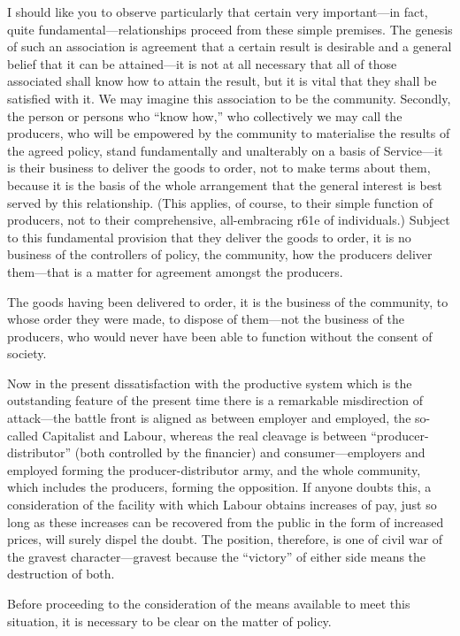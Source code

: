 \documentclass{book}
\begin{document}
I should like you to observe particularly that certain very important—in fact, quite fundamental—relationships proceed from these simple premises. The genesis of such an association is agreement that a certain result is desirable and a general belief that it can be attained—it is not at all necessary that all of those associated shall know how to attain the result, but it is vital that they shall be satisfied with it. We may imagine this association to be the community. Secondly, the person or persons who “know how,” who collectively we may call the producers, who will be empowered by the community to materialise the results of the agreed policy, stand fundamentally and unalterably on a basis of Service—it is their business to deliver the goods to order, not to make terms about them, because it is the basis of the whole arrangement that the general interest is best served by this relationship. (This applies, of course, to their simple function of producers, not to their comprehensive, all-embracing r61e of individuals.) Subject to this fundamental provision that they deliver the goods to order, it is no business of the controllers of policy, the community, how the producers deliver them—that is a matter for agreement amongst the producers.

The goods having been delivered to order, it is the business of the community, to whose order they were made, to dispose of them—not the business of the producers, who would never have been able to function without the consent of society.

Now in the present dissatisfaction with the productive system which is the outstanding feature of the present time there is a remarkable misdirection of attack—the battle front is aligned as between employer and employed, the so-called Capitalist and Labour, whereas the real cleavage is between “producer-distributor” (both controlled by the financier) and consumer—employers and employed forming the producer-distributor army, and the whole community, which includes the producers, forming the opposition. If anyone doubts this, a consideration of the facility with which Labour obtains increases of pay, just so long as these increases can be recovered from the public in the form of increased prices, will surely dispel the doubt. The position, therefore, is one of civil war of the gravest character—gravest because the “victory” of either side means the destruction of both.

Before proceeding to the consideration of the means available to meet this situation, it is necessary to be clear on the matter of policy.
\end{document}
